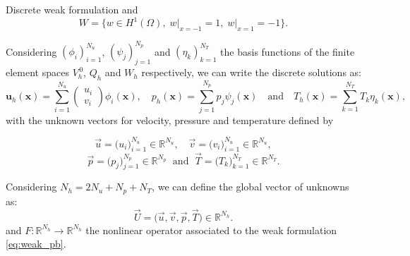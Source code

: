 \begin{frame}[allowframebreaks]{Discrete weak formulation}
	and
	$$W = \{w\in H^1(\Omega), \; w\vert_{x=-1}=1, \; w\vert_{x=1}=-1\}.$$

	\newpage

	Considering $(\phi_i)_{i=1}^{N_u}$, $(\psi_j)_{j=1}^{N_p}$ and $(\eta_k)_{k=1}^{N_T}$ the basis functions of the finite element spaces $V_h^{\, 0}$, $Q_h$ and $W_h$ respectively, we can write the discrete solutions as:
	\begin{equation*}
		\bm{u}_h(\bm{x}) = \sum_{i=1}^{N_u} \begin{pmatrix}
			u_i \\
			v_i
		\end{pmatrix} \phi_i(\bm{x}), \quad p_h(\bm{x}) = \sum_{j=1}^{N_p} p_j \psi_j(\bm{x}) \quad \text{and} \quad T_h(\bm{x}) = \sum_{k=1}^{N_T} T_k \eta_k(\bm{x}),
	\end{equation*}	
	with the unknown vectors for velocity, pressure and temperature defined by

	\vspace{-5pt}
	$$\vec{u} = \big(u_i\big)_{i=1}^{N_u} \in \mathbb{R}^{N_u}, \quad \vec{v} = \big(v_i\big)_{i=1}^{N_u} \in \mathbb{R}^{N_u},$$
	$$\vec{p} = \big(p_j\big)_{j=1}^{N_p} \in \mathbb{R}^{N_p} \; \text{ and } \; \vec{T} = \big(T_k\big)_{k=1}^{N_T} \in \mathbb{R}^{N_T}.$$

	\vspace{5pt}
	Considering $N_h = 2N_u + N_p + N_T$, we can define the global vector of unknowns as:
	\begin{equation*}
		\vec{U} = \big(\vec{u}, \vec{v}, \vec{p}, \vec{T}) \in \mathbb{R}^{N_h}.
	\end{equation*}
	and $F:\mathbb{R}^{N_h} \to \mathbb{R}^{N_h}$ the nonlinear operator associated to the weak formulation \eqref{eq:weak_pb}.
\end{frame}

